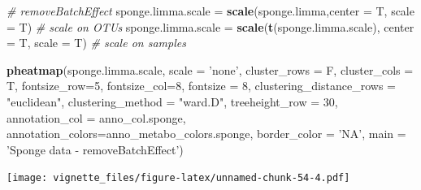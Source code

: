 \documentclass[]{book}
\newenvironment{Shaded}{\begin{snugshade}}{\end{snugshade}}
\newcommand{\KeywordTok}[1]{\textcolor[rgb]{0.13,0.29,0.53}{\textbf{#1}}}
\newcommand{\DataTypeTok}[1]{\textcolor[rgb]{0.13,0.29,0.53}{#1}}
\newcommand{\DecValTok}[1]{\textcolor[rgb]{0.00,0.00,0.81}{#1}}
\newcommand{\StringTok}[1]{\textcolor[rgb]{0.31,0.60,0.02}{#1}}
\newcommand{\CommentTok}[1]{\textcolor[rgb]{0.56,0.35,0.01}{\textit{#1}}}
\newcommand{\NormalTok}[1]{#1}
\begin{document}
\begin{Shaded}
\begin{Highlighting}[]
\CommentTok{# removeBatchEffect}
\NormalTok{sponge.limma.scale =}\StringTok{ }\KeywordTok{scale}\NormalTok{(sponge.limma,}\DataTypeTok{center =}\NormalTok{ T, }\DataTypeTok{scale =}\NormalTok{ T) }\CommentTok{# scale on OTUs}
\NormalTok{sponge.limma.scale =}\StringTok{ }\KeywordTok{scale}\NormalTok{(}\KeywordTok{t}\NormalTok{(sponge.limma.scale), }\DataTypeTok{center =}\NormalTok{ T, }\DataTypeTok{scale =}\NormalTok{ T) }\CommentTok{# scale on samples}

\KeywordTok{pheatmap}\NormalTok{(sponge.limma.scale, }
         \DataTypeTok{scale =} \StringTok{'none'}\NormalTok{, }
         \DataTypeTok{cluster_rows =}\NormalTok{ F, }
         \DataTypeTok{cluster_cols =}\NormalTok{ T, }
         \DataTypeTok{fontsize_row=}\DecValTok{5}\NormalTok{, }\DataTypeTok{fontsize_col=}\DecValTok{8}\NormalTok{,}
         \DataTypeTok{fontsize =} \DecValTok{8}\NormalTok{,}
         \DataTypeTok{clustering_distance_rows =} \StringTok{"euclidean"}\NormalTok{,}
         \DataTypeTok{clustering_method =} \StringTok{"ward.D"}\NormalTok{,}
         \DataTypeTok{treeheight_row =} \DecValTok{30}\NormalTok{,}
         \DataTypeTok{annotation_col =}\NormalTok{ anno_col.sponge,}
         \DataTypeTok{annotation_colors=}\NormalTok{anno_metabo_colors.sponge,}
         \DataTypeTok{border_color =} \StringTok{'NA'}\NormalTok{,}
         \DataTypeTok{main =} \StringTok{'Sponge data - removeBatchEffect'}\NormalTok{)}
\end{Highlighting}
\end{Shaded}

\texttt{[image: vignette\_files/figure-latex/unnamed-chunk-54-4.pdf]}
\end{document}
